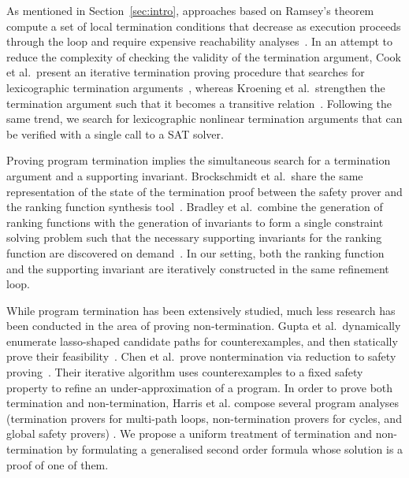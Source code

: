 \documentclass[preprint]{sigplanconf}
\theoremstyle{definition}
\begin{document}
As mentioned in Section~\ref{sec:intro}, approaches based on Ramsey's
theorem compute a set of local termination conditions that decrease as
execution proceeds through the loop and require expensive reachability
analyses~\cite{DBLP:conf/lpe/CodishG03, DBLP:conf/lics/PodelskiR04,
DBLP:conf/pldi/CookPR06}.  In an attempt to reduce the complexity of
checking the validity of the termination argument, Cook et al.~present an
iterative termination proving procedure that searches for lexicographic
termination arguments~\cite{DBLP:conf/tacas/CookSZ13}, whereas Kroening et
al.~strengthen the termination argument such that it becomes a transitive
relation~\cite{DBLP:conf/cav/KroeningSTW10}. Following the same trend, 
we search for lexicographic nonlinear termination arguments that can be verified 
with a single call to a SAT solver. 


Proving program termination implies the simultaneous search for a
termination argument and a supporting invariant.  Brock\-schmidt et
al.~share the same representation of the state of the termination proof
between the safety prover and the ranking function synthesis
tool~\cite{DBLP:conf/cav/BrockschmidtCF13}.  Bradley et al.~combine the
generation of ranking functions with the generation of invariants to form a
single constraint solving problem such that the necessary supporting
invariants for the ranking function are discovered on
demand~\cite{DBLP:conf/cav/BradleyMS05}.  In our setting, both the ranking
function and the supporting invariant are iteratively constructed in the
same refinement loop.

While program termination has been extensively studied, much less research
has been conducted in the area of proving non-termination.  Gupta et
al.~dynamically enumerate lasso-shaped candidate paths for counterexamples,
and then statically prove their
feasibility~\cite{DBLP:conf/popl/GuptaHMRX08}.  Chen et al.~prove
nontermination via reduction to safety
proving~\cite{DBLP:conf/tacas/ChenCFNO14}.  Their iterative algorithm uses
counterexamples to a fixed safety property to refine an under-approximation
of a program. In order to prove both termination and non-termination,
Harris et al. compose several program analyses (termination provers
for multi-path loops, non-termination provers for cycles, and global safety provers)
\cite{DBLP:conf/sas/HarrisLNR10}. We propose a uniform treatment of 
termination and non-termination by formulating a generalised second 
order formula whose solution is a proof of one of them.





{}
\end{document}
